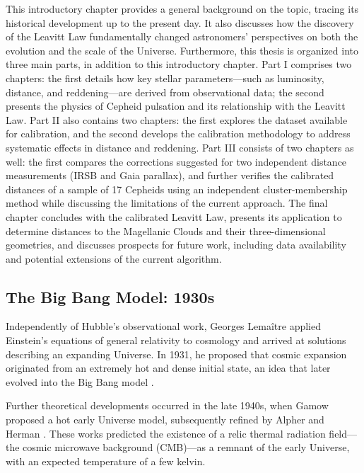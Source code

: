 This introductory chapter provides a general background on the topic, tracing its historical development up to the present day. It also discusses how the discovery of the Leavitt Law fundamentally changed astronomers' perspectives on both the evolution and the scale of the Universe. Furthermore, this thesis is organized into three main parts, in addition to this introductory chapter. Part I comprises two chapters: the first details how key stellar parameters—such as luminosity, distance, and reddening—are derived from observational data; the second presents the physics of Cepheid pulsation and its relationship with the Leavitt Law. Part II also contains two chapters: the first explores the dataset available for calibration, and the second develops the calibration methodology to address systematic effects in distance and reddening. Part III consists of two chapters as well: the first compares the corrections suggested for two independent distance measurements (IRSB and Gaia parallax), and further verifies the calibrated distances of a sample of 17 Cepheids using an independent cluster-membership method while discussing the limitations of the current approach. The final chapter concludes with the calibrated Leavitt Law, presents its application to determine distances to the Magellanic Clouds and their three-dimensional geometries, and discusses prospects for future work, including data availability and potential extensions of the current algorithm.




\subsection{The Big Bang Model: 1930s}

Independently of Hubble’s observational work, Georges Lemaître applied Einstein’s equations of general relativity to cosmology and arrived at solutions describing an expanding Universe. In 1931, he proposed that cosmic expansion originated from an extremely hot and dense initial state, an idea that later evolved into the Big Bang model \citep{1931lemaitre}.

Further theoretical developments occurred in the late 1940s, when Gamow proposed a hot early Universe model, subsequently refined by Alpher and Herman \citep{1948gamow,1948alpher}. These works predicted the existence of a relic thermal radiation field—the cosmic microwave background (CMB)—as a remnant of the early Universe, with an expected temperature of a few kelvin.

